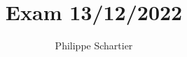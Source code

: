 \documentclass[10pt,twocolumn,letterpaper]{article}
\begin{document}
\nocite{*}

\title{Exam 13/12/2022}
\author{Philippe Schartier}
\maketitle


{\small


}
\end{document}
